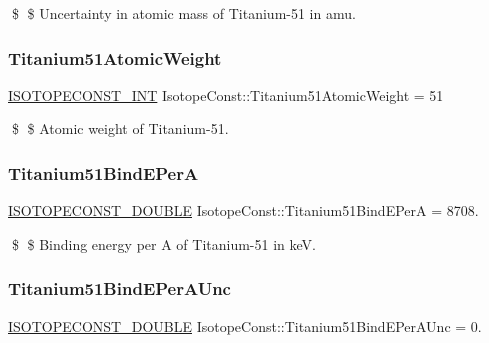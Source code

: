 \$ \$ Uncertainty in atomic mass of Titanium-\/51 in amu. \mbox{\label{group___isotope_const-_titanium-_ti51_gafdf271635ffe0af2bf161122f33f3579}} 
\subsubsection{\texorpdfstring{Titanium51\+Atomic\+Weight}{Titanium51AtomicWeight}}
{\footnotesize\ttfamily \mbox{\hyperlink{group___isotope_const-_macros_ga5f18360b3e99483a35c32d789e62621c}{I\+S\+O\+T\+O\+P\+E\+C\+O\+N\+S\+T\+\_\+\+I\+NT}} Isotope\+Const\+::\+Titanium51\+Atomic\+Weight = 51}

\$ \$ Atomic weight of Titanium-\/51. \mbox{\label{group___isotope_const-_titanium-_ti51_ga3b601d58df176f511c7363c659b24fc5}} 
\subsubsection{\texorpdfstring{Titanium51\+Bind\+E\+PerA}{Titanium51BindEPerA}}
{\footnotesize\ttfamily \mbox{\hyperlink{group___isotope_const-_macros_ga8f45a7272ce02c0b4c65c44636ed719a}{I\+S\+O\+T\+O\+P\+E\+C\+O\+N\+S\+T\+\_\+\+D\+O\+U\+B\+LE}} Isotope\+Const\+::\+Titanium51\+Bind\+E\+PerA = 8708.}

\$ \$ Binding energy per A of Titanium-\/51 in keV. \mbox{\label{group___isotope_const-_titanium-_ti51_ga0527917e9b2104e8cb3ecccc4ce2e5fa}} 
\subsubsection{\texorpdfstring{Titanium51\+Bind\+E\+Per\+A\+Unc}{Titanium51BindEPerAUnc}}
{\footnotesize\ttfamily \mbox{\hyperlink{group___isotope_const-_macros_ga8f45a7272ce02c0b4c65c44636ed719a}{I\+S\+O\+T\+O\+P\+E\+C\+O\+N\+S\+T\+\_\+\+D\+O\+U\+B\+LE}} Isotope\+Const\+::\+Titanium51\+Bind\+E\+Per\+A\+Unc = 0.}


